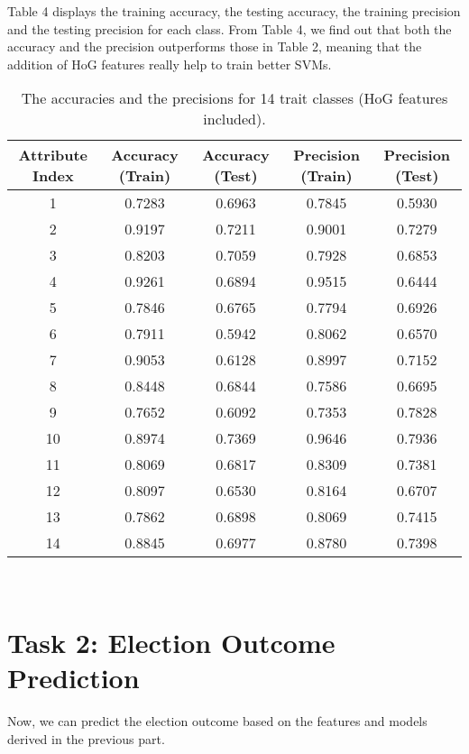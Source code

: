 \documentclass[10pt]{article}
\begin{document}
	 Table 4 displays the training accuracy, the testing accuracy, the training precision and the testing precision for each class. From Table 4, we find out that both the accuracy and the precision outperforms those in Table 2, meaning that the addition of HoG features really help to train better SVMs.\\
	 \begin{table}[ht]
 		\centering
 		\begin{tabular}{|c|c|c|c|c|}
		\hline
		\textbf{Attribute Index} & \textbf{Accuracy (Train)} & \textbf{Accuracy (Test)} & \textbf{Precision (Train)} & \textbf{Precision (Test)} \\ \hline
		1 & 0.7283 & 0.6963 & 0.7845 & 0.5930\\ \hline
		2 & 0.9197 & 0.7211 & 0.9001 & 0.7279\\ \hline
		3 & 0.8203 & 0.7059 & 0.7928 & 0.6853\\ \hline
		4 & 0.9261 & 0.6894 & 0.9515 & 0.6444\\ \hline
		5 & 0.7846 & 0.6765 & 0.7794 & 0.6926\\ \hline
		6 & 0.7911 & 0.5942 & 0.8062 & 0.6570\\ \hline
		7 & 0.9053 & 0.6128 & 0.8997 & 0.7152\\ \hline
		8 & 0.8448 & 0.6844 & 0.7586 & 0.6695\\ \hline
		9 & 0.7652 & 0.6092 & 0.7353 & 0.7828\\ \hline
		10 & 0.8974 & 0.7369 & 0.9646 & 0.7936\\ \hline
		11 & 0.8069 & 0.6817 & 0.8309 & 0.7381\\ \hline
		12 & 0.8097 & 0.6530 & 0.8164 & 0.6707\\ \hline
		13 & 0.7862 & 0.6898 & 0.8069 & 0.7415\\ \hline
		14 & 0.8845 & 0.6977 & 0.8780 & 0.7398\\ \hline
 		\end{tabular}
		\caption{The accuracies and the precisions for 14 trait classes (HoG features included).}\label{tab4}
	\end{table}\\
\newpage\section*{\large{Task 2: Election Outcome Prediction}}
	Now, we can predict the election outcome based on the features and models derived in the previous part.\\ 
\end{document}

